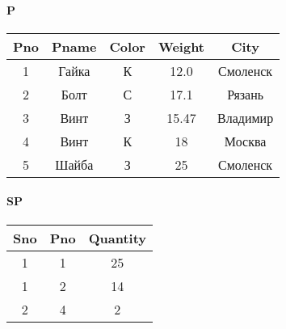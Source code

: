 \documentclass[a4paper, 14pt]{report}
\begin{document}
    \paragraph{P}

    \hfill

    \begin{tabular}{|c|c|c|c|c|}
        \hline
        Pno & Pname & Color & Weight & City \\
        \hline
        1 & Гайка & К & 12.0 & Смоленск \\
        2 & Болт & С & 17.1 & Рязань \\
        3 & Винт & З & 15.47 & Владимир \\
        4 & Винт & К & 18 & Москва \\
        5 & Шайба & З & 25 & Смоленск \\
        \hline
    \end{tabular}

    \paragraph{SP}

    \hfill

    \begin{tabular}{|c|c|c|}
        \hline
        Sno & Pno & Quantity \\
        \hline
        1 & 1 & 25 \\
        1 & 2 & 14 \\
        2 & 4 & 2 \\
        \hline
    \end{tabular}
\end{document}
